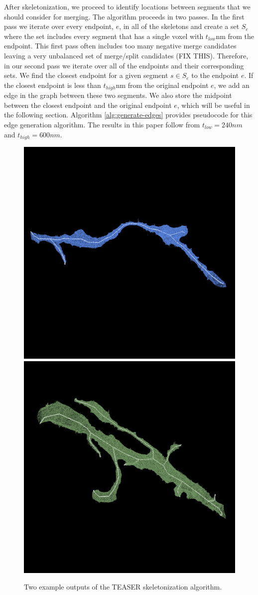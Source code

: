 After skeletonization, we proceed to identify locations between segments that we should consider for merging. The algorithm proceeds in two passes. In the first pass we iterate over every endpoint, $e$, in all of the skeletons and create a set $S_e$ where the set includes every segment that has a single voxel with $t_{low}$nm from the endpoint. This first pass often includes too many negative merge candidates leaving a very unbalanced set of merge/split candidates (FIX THIS). Therefore, in our second pass we iterate over all of the endpoints and their corresponding sets. We find the closest endpoint for a given segment $s \in S_e$ to the endpoint $e$. If the closest endpoint is less than $t_{high}$nm from the original endpoint $e$, we add an edge in the graph between these two segments. We also store the midpoint between the closest endpoint and the original endpoint $e$, which will be useful in the following section. Algorithm \ref{alg:generate-edges} provides pseudocode for this edge generation algorithm. The results in this paper follow from $t_{low} = 240nm$ and $t_{high} = 600nm$. 

\begin{figure}[t]
	\centering
	\includegraphics[width=0.42\linewidth]{./figures/skeleton1.png}
	\hspace{0.085\linewidth}
	\includegraphics[width=0.42\linewidth]{./figures/skeleton2.png}
	\caption{Two example outputs of the TEASER skeletonization algorithm.}
	\label{fig:skeletonization}
\end{figure}

